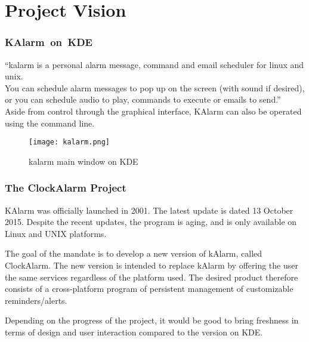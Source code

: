 \section{Project Vision}
\subsubsection{KAlarm~on~KDE}

``\gls{kalarm} is a personal alarm message, command and email scheduler for
\gls{linux} and \gls{unix}. \\ You can schedule alarm messages to pop up on the
screen (with sound if desired), or you can schedule audio to play, commands to
execute or emails to send.''~\cite{kalarm_handbook}\\

Aside from control through the graphical interface, KAlarm can also be operated
using the command line.

\begin{figure}[h]
    \centering
    \caption{\gls{kalarm} main window on KDE}
    \texttt{[image: kalarm.png]}
\end{figure}

\subsubsection{The ClockAlarm Project}
KAlarm was officially launched in 2001. The latest update is dated 13 October
2015. Despite the recent updates, the program is aging, and is only available on
Linux and UNIX platforms.

The goal of the mandate is to develop a new version of kAlarm, called
ClockAlarm. The new version is intended to replace kAlarm by offering the user
the same services regardless of the platform used.  The desired product
therefore consists of a cross-platform program of persistent management of
customizable reminders/alerts.

Depending on the progress of the project, it would be good to bring freshness in
terms of design and user interaction compared to the version on KDE.\@
